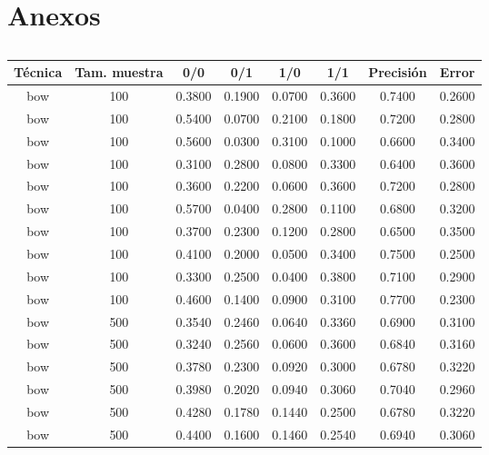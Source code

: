 \chapter*{Anexos}\label{ch:anexos}

\section*{}
\addtocounter{section}{1}
\setcounter{subsection}{0}

\begin{scriptsize}
\begin{longtable}{cccccccc}
	\toprule
	\textbf{Técnica} & \textbf{Tam. muestra} & \textbf{0/0} & \textbf{0/1} & \textbf{1/0} & \textbf{1/1} & \textbf{Precisión} & \textbf{Error}\\
	\midrule
	\endhead
	bow      & 100  & 0.3800 & 0.1900 & 0.0700 & 0.3600 & 0.7400 & 0.2600\\
	bow      & 100  & 0.5400 & 0.0700 & 0.2100 & 0.1800 & 0.7200 & 0.2800 \\
	bow      & 100  & 0.5600 & 0.0300 & 0.3100 & 0.1000 & 0.6600 & 0.3400 \\
	bow      & 100  & 0.3100 & 0.2800 & 0.0800 & 0.3300 & 0.6400 & 0.3600 \\
	bow      & 100  & 0.3600 & 0.2200 & 0.0600 & 0.3600 & 0.7200 & 0.2800 \\
	bow      & 100  & 0.5700 & 0.0400 & 0.2800 & 0.1100 & 0.6800 & 0.3200 \\
	bow      & 100  & 0.3700 & 0.2300 & 0.1200 & 0.2800 & 0.6500 & 0.3500 \\
	bow      & 100  & 0.4100 & 0.2000 & 0.0500 & 0.3400 & 0.7500 & 0.2500 \\
	bow      & 100  & 0.3300 & 0.2500 & 0.0400 & 0.3800 & 0.7100 & 0.2900 \\
	bow      & 100  & 0.4600 & 0.1400 & 0.0900 & 0.3100 & 0.7700 & 0.2300 \\
	bow      & 500  & 0.3540 & 0.2460 & 0.0640 & 0.3360 & 0.6900 & 0.3100 \\
	bow      & 500  & 0.3240 & 0.2560 & 0.0600 & 0.3600 & 0.6840 & 0.3160 \\
	bow      & 500  & 0.3780 & 0.2300 & 0.0920 & 0.3000 & 0.6780 & 0.3220 \\
	bow      & 500  & 0.3980 & 0.2020 & 0.0940 & 0.3060 & 0.7040 & 0.2960 \\
	bow      & 500  & 0.4280 & 0.1780 & 0.1440 & 0.2500 & 0.6780 & 0.3220 \\
	bow      & 500  & 0.4400 & 0.1600 & 0.1460 & 0.2540 & 0.6940 & 0.3060 \\

\end{longtable}
\end{scriptsize}
